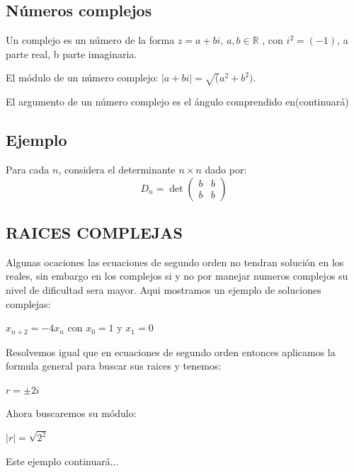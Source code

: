 \documentclass{article}
\begin{document}
\subsection{Números  complejos}

Un complejo es un número de la forma $z=a+bi$, $a,b\in\mathbb{R}$ , con $i^2=(-1)$, a parte real, b parte imaginaria.

El módulo de un número complejo: $|a+bi|=\surd(a^2+b^2)$.


El argumento de un número complejo es el ángulo comprendido en(continuará)


\subsection{Ejemplo}

Para cada $n$, considera el determinante $n\times n$ dado por:
\begin{equation}
  \label{eq:1}
  D_n=\det
  \begin{pmatrix}
    b & b\\
    b & b 
  \end{pmatrix}
\end{equation}

\subsection{RAICES COMPLEJAS}

Algunas ocaciones las ecuaciones de segundo orden no tendran solución en los reales, sin embargo en los complejos si y no por manejar numeros complejos su nivel de dificultad sera mayor. Aqui mostramos un ejemplo de soluciones complejas:

$x_{n+2}=-4x_{n}$ con $x_0=1$ y $x_1=0$

Resolvemos igual que en ecuaciones de segundo orden entonces aplicamos la formula general para buscar sus raices y tenemos:

$r=\pm2i$

Ahora buscaremos su módulo:

$|r|=\sqrt{2^2}$

Este ejemplo continuará...
\end{document}
